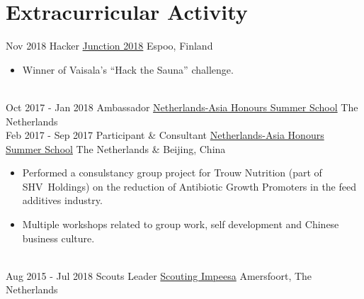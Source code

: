 \documentclass[a4paper]{twentysecondcv} %
\begin{document}

\section{Extracurricular Activity}
\begin{twenty} %
	\twentyitem
	{Nov 2018}
	{}
	{Hacker}
	{\href{https://hackjunction.com/}{Junction 2018}}
	{Espoo, Finland}
	{
	\begin{itemize}
			\item Winner of Vaisala's ``Hack the Sauna'' challenge.
	\end{itemize}
	}
	\\
	\twentyitem
	{Oct 2017 -}
	{Jan 2018}
	{Ambassador}
	{\href{https://nahss.nl}{Netherlands-Asia Honours Summer School}}
	{The Netherlands}
	{}
	\\
	\twentyitem
	{Feb 2017 -}
	{Sep 2017}
	{Participant \& Consultant}
	{\href{https://nahss.nl}{Netherlands-Asia Honours Summer School}}
	{The Netherlands \& Beijing, China}
	{
		\begin{itemize}
			\item Performed a consulstancy group project for Trouw Nutrition (part of SHV~Holdings) on the reduction of Antibiotic Growth Promoters in the feed additives industry.
			\item Multiple workshops related to group work, self development and Chinese business culture.
		\end{itemize}
	}
	\\
	\twentyitem
	{Aug 2015 -}
	{Jul 2018}
	{Scouts Leader}
	{\href{http://impeesa.nl/}{Scouting Impeesa}}
	{Amersfoort, The Netherlands}
	{}
	\\
\end{twenty}
\end{document}
